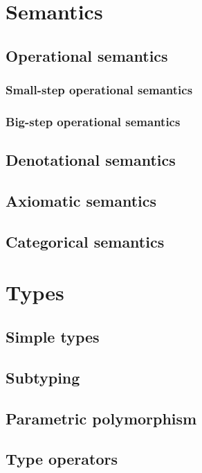 \documentclass[12pt,oneside]{memoir}
\begin{document}
  \part{Semantics}

    \chapter{Operational semantics}

      \section{Small-step operational semantics}

      \section{Big-step operational semantics}

    \chapter{Denotational semantics}

    \chapter{Axiomatic semantics}

    \chapter{Categorical semantics}

  \part{Types}

    \chapter{Simple types}

    \chapter{Subtyping}

    \chapter{Parametric polymorphism}

    \chapter{Type operators}
\end{document}
